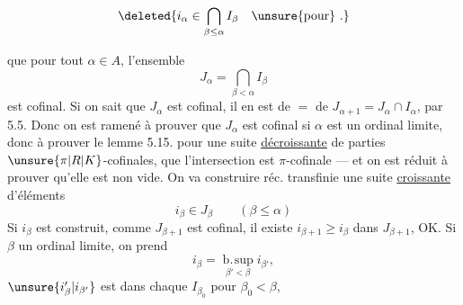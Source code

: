 \[
 \deleted{i_\alpha\in\bigcap_{\beta\leq\alpha}I_\beta\quad\unsure{\text{pour}}\ .}
\]

que pour tout $\alpha\in A$, l'ensemble
\[
 J_\alpha=\bigcap_{\beta<\alpha}I_\beta
\]
est cofinal. Si on sait que $J_\alpha$ est cofinal, il en est de $=$ de $J_{\alpha+1}=J_\alpha\cap I_\alpha$, par 5.5. Donc on est ramené à prouver que $J_\alpha$ est cofinal si $\alpha$ est un ordinal limite, donc à prouver le lemme 5.15. pour une suite  \uline{décroissante} de parties  $\unsure{\pi|R|K}$-cofinales,     que l'intersection est $\pi$-cofinale --- et on est réduit à prouver qu'elle est non vide. On va construire  réc. transfinie une suite \uline{croissante} d'éléments
\[
 i_\beta\in J_\beta\qquad(\beta\leq\alpha)
\]
Si $i_\beta$ est construit, comme $J_{\beta+1}$ est cofinal, il existe $i_{\beta+1}\geq i_\beta$ dans $J_{\beta+1}$, OK. Si $\beta$  un ordinal limite, on prend
\[
 i_\beta=\mathop{\mathrm{b.\!sup}}\limits_{\beta'<\beta} i_{\beta'}, 
\]
$\unsure{i'_\beta|i_{\beta'}}$ est dans  chaque $I_{\beta_0}$ pour $\beta_0<\beta$,
